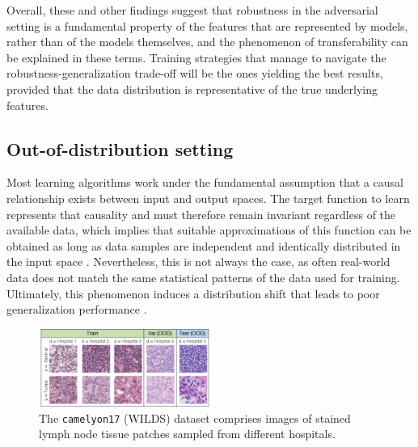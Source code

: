 Overall, these and other findings suggest that robustness in the adversarial setting
is a fundamental property of the features that are represented by models, 
rather than of the models themselves, and the phenomenon of transferability can be
explained in these terms. Training strategies that manage to navigate the 
robustness-generalization trade-off will be the ones yielding 
the best results, provided that the data distribution
is representative of the true underlying features. 

\subsection{Out-of-distribution setting}\label{sec:intro_ood}

Most learning algorithms work under the fundamental assumption that
a causal relationship exists between input and output spaces. The target function to 
learn represents that causality and must therefore remain 
invariant regardless of the available data, which implies that 
suitable approximations of this 
function can be obtained as long as data samples are independent 
and identically distributed in the input space
\cite{muandetDomainGeneralizationInvariant2013,quinonero-candelaDatasetShiftMachine2009}. 
Nevertheless, this is not always
the case, as often real-world data does not match the same statistical
patterns of the data used for training. Ultimately, this phenomenon induces a
distribution shift that leads to poor generalization performance
\cite{zhouDomainGeneralizationSurvey2022,wangGeneralizingUnseenDomains2022,liuOutOfDistributionGeneralizationSurvey2023}. \\

\begin{figure}[h]
    \centering
    \includegraphics[width=0.5\textwidth]{img/introduction/camelyon17.png}
    \caption{The \texttt{camelyon17} (WILDS) dataset comprises images of stained 
    lymph node tissue patches sampled from different hospitals.
    \cite{kohWILDSBenchmarkIntheWild2021}
    }
    \label{fig:camelyon17}
\end{figure}

